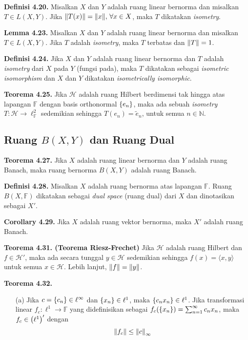 \documentclass{article}
\begin{document}
\begin{multicols}{2}
  \textbf{Definisi 4.20.} Misalkan \(X\) dan \(Y\) adalah ruang linear bernorma dan misalkan \(T \in L(X,Y)\). Jika \(\norm{T(x)} = \norm{x},\, \forall x \in X\), maka \(T\) dikatakan \textit{isometry}.

  \textbf{Lemma 4.23.} Misalkan \(X\) dan \(Y\) adalah ruang linear bernorma dan misalkan \(T \in L(X,Y)\). Jika \(T\) adalah \textit{isometry}, maka \(T\) terbatas dan \(\norm{T} = 1\).

  \textbf{Definisi 4.24.} Jika \(X\) dan \(Y\) adalah ruang linear bernorma dan \(T\) adalah \textit{isometry} dari \(X\) pada \(Y\) (fungsi pada), maka \(T\) dikatakan sebagai \textit{isometric isomorphism} dan \(X\) dan \(Y\) dikatakan \textit{isometrically isomorphic}.

  \textbf{Teorema 4.25.} Jika \(\mathcal{H}\) adalah ruang Hilbert berdimensi tak hingga atas lapangan \(\mathbb{F}\) dengan basis orthonormal \(\qty{e_n}\), maka ada sebuah \textit{isometry} \(T: \mathcal{H} \to \ell^2_\mathbb{F}\) sedemikian sehingga \(T(e_n) = \tilde{e}_n\), untuk semua \(n \in \mathbb{N}\).
  \vspace{-1em}
  \subsection*{Ruang \(B(X,Y)\) dan Ruang Dual}
  \vspace{-1em}
  \textbf{Teorema 4.27.} Jika \(X\) adalah ruang linear bernorma dan \(Y\) adalah ruang Banach, maka ruang bernorma \(B(X,Y)\) adalah ruang Banach.

  \textbf{Definisi 4.28.} Misalkan \(X\) adalah ruang bernorma atas lapangan \(\mathbb{F}\). Ruang \(B(X,\mathbb{F})\) dikatakan sebagai \textit{dual space} (ruang dual) dari \(X\) dan dinotasikan sebagai \(X'\).

  \textbf{Corollary 4.29.} Jika \(X\) adalah ruang vektor bernorma, maka \(X'\) adalah ruang Banach.

  \textbf{Teorema 4.31. (Teorema Riesz-Frechet)} Jika \(\mathcal{H}\) adalah ruang Hilbert dan \(f\in \mathcal{H}'\), maka ada secara tunggal \(y \in \mathcal{H}\) sedemikian sehingga \(f(x) = \langle x,y \rangle\) untuk semua \(x \in \mathcal{H}\). Lebih lanjut, \(\norm{f} = \norm{y}\).

  \textbf{Teorema 4.32.}
  \begin{itemize}
    \item[(a)] Jika \(c = \qty{c_n} \in \ell^\infty\) dan \(\qty{x_n}\in \ell^1\), maka \(\qty{c_nx_n} \in \ell^1\). Jika transformasi linear \(f_c: \ell^1\to \mathbb{F}\) yang didefinisikan sebagai \(f_c(\qty{x_n}) = \sum_{n=1}^\infty c_nx_n\), maka \(f_c \in \qty(\ell^1)'\) dengan \[\norm{f_c} \leq \norm{c}_\infty\]


\end{itemize}
\end{multicols}
\end{document}
